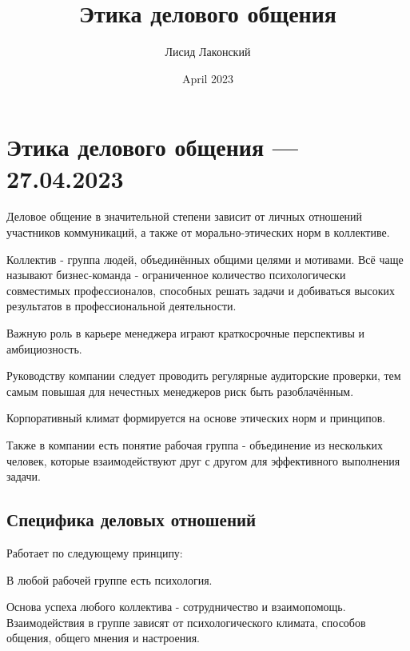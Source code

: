 \documentclass{article}
\title{Этика делового общения}
\author{Лисид Лаконский}
\date{April 2023}
\begin{document}
\raggedright

\maketitle
\tableofcontents
\pagebreak

\section{Этика делового общения — 27.04.2023}

Деловое общение в значительной степени зависит от личных отношений участников коммуникаций, а также от морально-этических норм в коллективе.

Коллектив - группа людей, объединённых общими целями и мотивами. Всё чаще называют бизнес-команда - ограниченное количество психологически совместимых профессионалов, способных решать задачи и добиваться высоких результатов в профессиональной деятельности.

Важную роль в карьере менеджера играют краткосрочные перспективы
и амбициозность.

Руководству компании следует проводить регулярные аудиторские проверки, тем самым повышая для нечестных менеджеров риск быть разоблачённым.

Корпоративный климат формируется на основе этических норм и принципов.

Также в компании есть понятие рабочая группа - объединение из нескольких человек, которые взаимодействуют друг с другом для эффективного выполнения задачи.

\subsection{Специфика деловых отношений}

Работает по следующему принципу:

\begin{multienumerate}
\end{multienumerate}

В любой рабочей группе есть психология.

Основа успеха любого коллектива - сотрудничество и взаимопомощь. Взаимодействия в группе зависят от психологического климата, способов общения, общего мнения и настроения.
\end{document}
